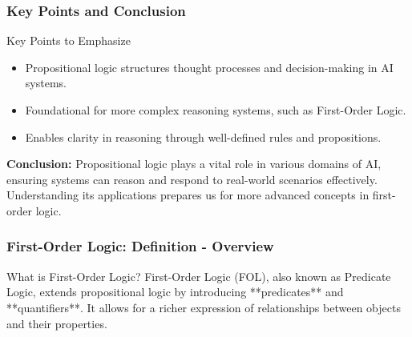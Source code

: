 \documentclass[aspectratio=169]{beamer}
\begin{document}
\begin{frame}[fragile]
    \frametitle{Key Points and Conclusion}
    \begin{block}{Key Points to Emphasize}
        \begin{itemize}
            \item Propositional logic structures thought processes and decision-making in AI systems.
            \item Foundational for more complex reasoning systems, such as First-Order Logic.
            \item Enables clarity in reasoning through well-defined rules and propositions.
        \end{itemize}
    \end{block}
    
    \textbf{Conclusion:}  
    Propositional logic plays a vital role in various domains of AI, ensuring systems can reason and respond to real-world scenarios effectively. Understanding its applications prepares us for more advanced concepts in first-order logic.
\end{frame}

\begin{frame}[fragile]
    \frametitle{First-Order Logic: Definition - Overview}
    \begin{block}{What is First-Order Logic?}
        First-Order Logic (FOL), also known as Predicate Logic, extends propositional logic by introducing **predicates** and **quantifiers**. 
        It allows for a richer expression of relationships between objects and their properties.
    \end{block}
\end{frame}
\end{document}
